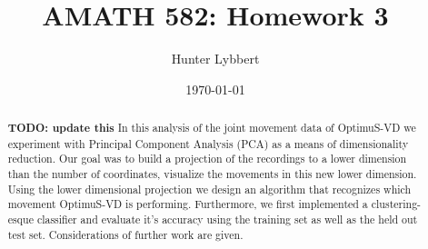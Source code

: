 \documentclass[11pt]{amsart}
\title{AMATH 582: Homework 3}
\author{Hunter Lybbert} %
\date{\today} %
\begin{document}
\maketitle

\begin{abstract} \textbf{TODO: update this}
    In this analysis of the joint movement data of OptimuS-VD we experiment with Principal Component Analysis (PCA) as a means of dimensionality reduction.
    Our goal was to build a projection of the recordings to a lower dimension than the number of coordinates, visualize the movements in this new lower dimension.
    Using the lower dimensional projection we design an algorithm that recognizes which movement OptimuS-VD is performing.
    Furthermore, we first implemented a clustering-esque classifier and evaluate it's accuracy using the training set as well as the held out test set.
    Considerations of further work are given.
\end{abstract}
\end{document}
